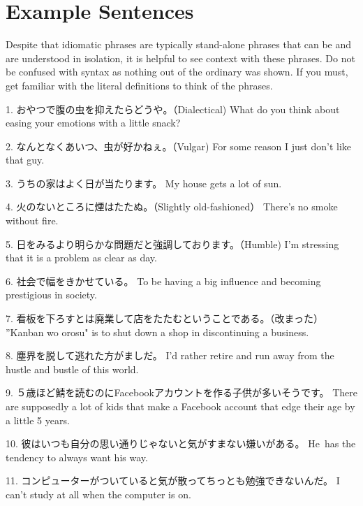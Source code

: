 \section{Example Sentences}
 
\par{ Despite that idiomatic phrases are typically stand-alone phrases that can be and are understood in isolation, it is helpful to see context with these phrases. Do not be confused with syntax as nothing out of the ordinary was shown. If you must, get familiar with the literal definitions to think of the phrases. }

\par{1. おやつで腹の虫を抑えたらどうや。（Dialectical) \hfill\break
What do you think about easing your emotions with a little snack? }

\par{2. なんとなくあいつ、虫が好かねぇ。（Vulgar) \hfill\break
For some reason I just don't like that guy. }

\par{3. うちの家はよく日が当たります。 \hfill\break
My house gets a lot of sun. }

\par{4. 火のないところに煙はたたぬ。（Slightly old-fashioned） \hfill\break
There's no smoke without fire. }

\par{5. 日をみるより明らかな問題だと強調しております。（Humble) \hfill\break
I'm stressing that it is a problem as clear as day. }

\par{6. 社会で幅をきかせている。 \hfill\break
To be having a big influence and becoming prestigious in society. }

\par{7. 看板を下ろすとは廃業して店をたたむということである。（改まった） \hfill\break
”Kanban wo orosu" is to shut down a shop in discontinuing a business. }

\par{8. 塵界を脱して逃れた方がましだ。 \hfill\break
I'd rather retire and run away from the hustle and bustle of this world. }

\par{9. ５歳ほど鯖を読むのにFacebookアカウントを作る子供が多いそうです。 \hfill\break
There are supposedly a lot of kids that make a Facebook account that edge their age by a little 5 years. }

\par{10. 彼はいつも自分の思い通りじゃないと気がすまない嫌いがある。 \hfill\break
He has the tendency to always want his way. }

\par{11. コンピューターがついていると気が散ってちっとも勉強できないんだ。 \hfill\break
I can't study at all when the computer is on. }
    